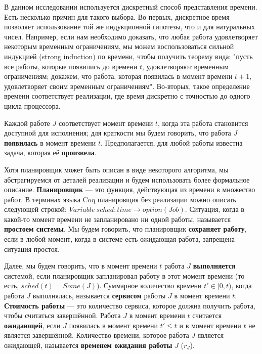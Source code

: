 \documentclass[14pt]{matmex-diploma-custom}
\begin{document}
В данном исследовании используется дискретный способ представления времени. 
  Есть несколько причин для такого выбора. Во-первых, дискретное
  время позволяет использование той же индукционной гипотезы, что и для натуральных чисел. 
  Например, если нам необходимо 
  доказать, что любая работа удовлетворяет некоторым временным ограничениям, мы можем 
  воспользоваться сильной индукцией (strong induction) по времени, чтобы получить теорему вида: "пусть все работы, 
  которые появились до времени $t$, удовлетворяют временным ограничениям; 
  докажем, что работа, которая появилась в момент времени $t + 1$, удовлетворяет 
  своим временным ограничениям". Во-вторых, такое определение времени соответствует
  реализации, где время дискретно с точностью до одного цикла процессора. 

Каждой работе $J$ соответствует момент времени $t$, когда эта работа становится 
  доступной для исполнения; для краткости мы будем говорить, что работа $J$
  \textbf{появилась} в момент времени $t$. Предполагается, для любой работы известна задача, 
  которая её \textbf{произвела}.

Хотя планировщик может быть описан в виде некоторого алгоритма, мы абстрагируемся от 
  деталей реализации и будем использовать более формальное описание. \textbf{Планировщик} 
  --- это функция, действующая из времени в множество работ. В терминах языка Coq 
  планировщик без реализации можно описать следующей строкой: $Variable \ sched: time
  \rightarrow option (Job)$. Ситуация, когда в какой-то момент времени не запланировано 
  ни одной работы, называется \textbf{простоем системы}. Мы будем говорить, что планировщик
  \textbf{сохраняет работу}, если в любой момент, когда в системе есть 
  ожидающая работа, запрещена ситуация простоя.

Далее, мы будем говорить, что в момент времени $t$ работа $J$ \textbf{выполняется} системой, 
  если планировщик запланировал работу в этот момент времени (то есть, $sched(t) = Some(J)$).
  Суммарное количество времени $t' \in [0, t)$, когда работа $J$ выполнялась, 
  называется \textbf{сервисом} работы $J$ в момент времени $t$. 
  \textbf{Стоимость работы} --- это количество сервиса, которое должна получить работа, 
  чтобы считаться завершённой. Работа $J$ в момент времени $t$ считается \textbf{ожидающей}, 
  если $J$ появилась в момент времени $t' \leq t$ и в момент времени $t$ не является завершённой.
  Количество времени, которое работа $J$ является ожидающей, называется \textbf{временем ожидания работы} $J$ ($r_J$). 
\end{document}
